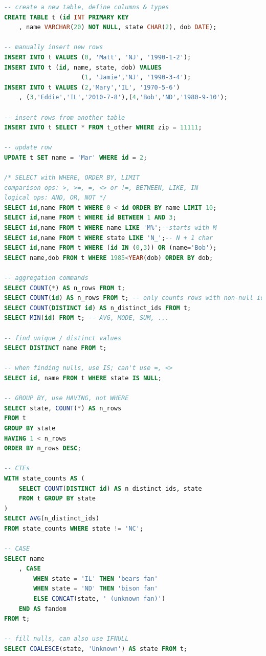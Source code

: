 \begin{lstlisting}[language=SQL]
-- create a new table, define columns & types
CREATE TABLE t (id INT PRIMARY KEY
	, name VARCHAR(20) NOT NULL, state CHAR(2), dob DATE);

-- manually insert new rows
INSERT INTO t VALUES (0, 'Matt', 'NJ', '1990-1-2');
INSERT INTO t (id, name, state, dob) VALUES
                     (1, 'Jamie','NJ', '1990-3-4');
INSERT INTO t VALUES (2,'Mary','IL', '1970-5-6')
	, (3,'Eddie','IL','2010-7-8'),(4,'Bob','ND','1980-9-10');

-- insert rows from another table
INSERT INTO t SELECT * FROM t_other WHERE zip = 11111;

-- update row
UPDATE t SET name = 'Mar' WHERE id = 2;

/* SELECT with WHERE, ORDER BY, LIMIT
comparison ops: >, >=, =, <> or !=, BETWEEN, LIKE, IN
logical ops: AND, OR, NOT */
SELECT id,name FROM t WHERE 0 < id ORDER BY name LIMIT 10;
SELECT id,name FROM t WHERE id BETWEEN 1 AND 3;
SELECT id,name FROM t WHERE name LIKE 'M%';--starts with M
SELECT id,name FROM t WHERE state LIKE 'N_';-- N + 1 char
SELECT id,name FROM t WHERE (id IN (0,3)) OR (name='Bob');
SELECT name,dob FROM t WHERE 1985<YEAR(dob) ORDER BY dob;

-- aggregation commands
SELECT COUNT(*) AS n_rows FROM t;
SELECT COUNT(id) AS n_rows FROM t; -- only counts rows with non-null id values
SELECT COUNT(DISTINCT id) AS n_distinct_ids FROM t;
SELECT MIN(id) FROM t; -- AVG, MODE, SUM, ...

-- find unique / distinct values
SELECT DISTINCT name FROM t;

-- when finding nulls, use IS; can't use =, <>
SELECT id, name FROM t WHERE state IS NULL;

-- GROUP BY, use HAVING, not WHERE
SELECT state, COUNT(*) AS n_rows
FROM t
GROUP BY state
HAVING 1 < n_rows
ORDER BY n_rows DESC;

-- CTEs
WITH state_counts AS (
	SELECT COUNT(DISTINCT id) AS n_distinct_ids, state
	FROM t GROUP BY state
)
SELECT AVG(n_distinct_ids)
FROM state_counts WHERE state != 'NC';

-- CASE
SELECT name
	, CASE
		WHEN state = 'IL' THEN 'bears fan'
		WHEN state = 'ND' THEN 'bison fan'
		ELSE CONCAT(state, ' (unknown fan)')
	END AS fandom
FROM t;

-- fill nulls, can also use IFNULL
SELECT COALESCE(state, 'Unknown') AS state FROM t;


\end{lstlisting}
